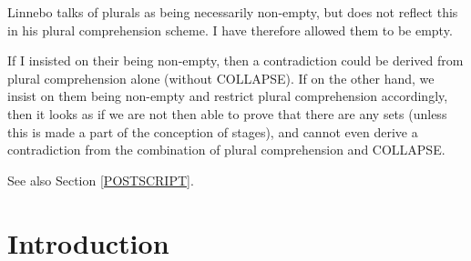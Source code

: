 \documentclass[11pt]{article}
\begin{document}
Linnebo talks of plurals as being necessarily non-empty, but does not reflect this in his plural comprehension scheme.
I have therefore allowed them to be empty.

If I insisted on their being non-empty, then a contradiction could be derived from plural comprehension alone (without COLLAPSE).
If on the other hand, we insist on them being non-empty and restrict plural comprehension accordingly, then it looks as if we are not then able to prove that there are any sets (unless this is made a part of the conception of stages), and cannot even derive a contradiction from the combination of plural comprehension and COLLAPSE.

See also Section \ref{POSTSCRIPT}.

\section{Introduction}
\end{document}
